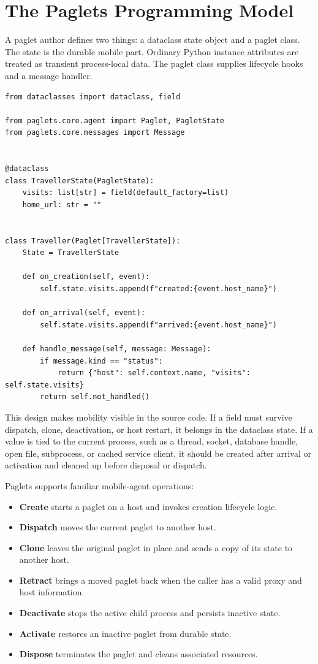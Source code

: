 \documentclass[11pt,a4paper]{article}
\begin{document}
\section{The Paglets Programming Model}

A paglet author defines two things: a dataclass state object and a paglet class.
The state is the durable mobile part. Ordinary Python instance attributes are
treated as transient process-local data. The paglet class supplies lifecycle
hooks and a message handler.

\Needspace{0.72\textheight}
\begin{lstlisting}[style=paglets-python,caption={A minimal paglet with explicit state.}]
from dataclasses import dataclass, field

from paglets.core.agent import Paglet, PagletState
from paglets.core.messages import Message


@dataclass
class TravellerState(PagletState):
    visits: list[str] = field(default_factory=list)
    home_url: str = ""


class Traveller(Paglet[TravellerState]):
    State = TravellerState

    def on_creation(self, event):
        self.state.visits.append(f"created:{event.host_name}")

    def on_arrival(self, event):
        self.state.visits.append(f"arrived:{event.host_name}")

    def handle_message(self, message: Message):
        if message.kind == "status":
            return {"host": self.context.name, "visits": self.state.visits}
        return self.not_handled()
\end{lstlisting}

This design makes mobility visible in the source code. If a field must survive
dispatch, clone, deactivation, or host restart, it belongs in the dataclass
state. If a value is tied to the current process, such as a thread, socket,
database handle, open file, subprocess, or cached service client, it should be
created after arrival or activation and cleaned up before disposal or dispatch.

Paglets supports familiar mobile-agent operations:

\begin{itemize}[leftmargin=*]
\item \textbf{Create} starts a paglet on a host and invokes creation lifecycle
  logic.
\item \textbf{Dispatch} moves the current paglet to another host.
\item \textbf{Clone} leaves the original paglet in place and sends a copy of its
  state to another host.
\item \textbf{Retract} brings a moved paglet back when the caller has a valid
  proxy and host information.
\item \textbf{Deactivate} stops the active child process and persists inactive
  state.
\item \textbf{Activate} restores an inactive paglet from durable state.
\item \textbf{Dispose} terminates the paglet and cleans associated resources.
\end{itemize}
\end{document}
